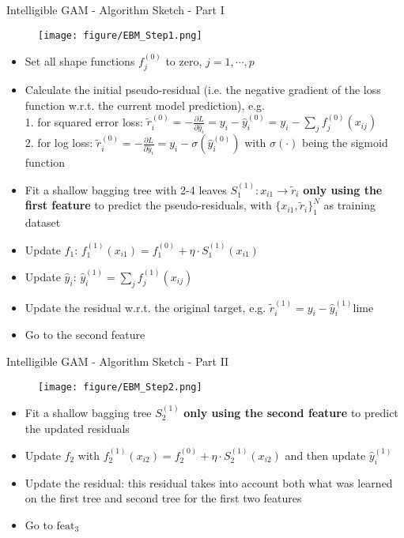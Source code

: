 \documentclass[10pt,compress,t,notes=noshow, xcolor=table]{beamer}
\begin{document}
\begin{frame}{Intelligible GAM - Algorithm Sketch - Part I}

\begin{figure}
    \centering
    \texttt{[image: figure/EBM\_Step1.png]}
    \label{fig:Intelligible EBM_Step1}
\end{figure}
\begin{itemize}
    \item Set all shape functions $f_j^{(0)}$ to zero, $j=1,\cdots,p$
    \item Calculate the initial pseudo-residual (i.e. the negative gradient of the loss function w.r.t. the current model prediction), e.g.\\
    1. for squared error loss: $\tilde{r}_i^{(0)}=-\frac{\partial L}{\partial \hat{y}_i}=y_i-\hat{y}_i^{(0)}=y_i-\sum_jf_j^{(0)}(x_{ij})$\\
    2. for log loss: $\tilde{r}_i^{(0)}=-\frac{\partial L}{\partial \hat{y}_i}=y_i-\sigma(\hat{y}_i^{(0)})$ with $\sigma(\cdot)$ being the sigmoid function
    \item Fit a shallow bagging tree with 2-4 leaves $S_1^{(1)}: x_{i1}\to \tilde{r}_i$ \textbf{only using the first feature} to predict the pseudo-residuals, with $\{x_{i1},\tilde{r}_i\}_1^N$ as training dataset
    \item Update $f_1$: $f_1^{(1)}(x_{i1})=f_1^{(0)}+\eta\cdot S_1^{(1)}(x_{i1})$
    \item Update $\hat{y}_i$: $\hat{y}_i^{(1)}=\sum_jf_j^{(1)}(x_{ij})$
    \item Update the residual w.r.t. the original target, e.g. $\tilde{r}_i^{(1)}=y_i-\hat{y}_i^{(1)}$lime
    \item Go to the second feature
\end{itemize}
\end{frame}

\begin{frame}{Intelligible GAM - Algorithm Sketch - Part II}
\begin{figure}
    \centering
    \texttt{[image: figure/EBM\_Step2.png]}
    \label{fig:Intelligible EBM_Step2}
\end{figure}
\begin{itemize}
    \item Fit a shallow bagging tree $S_2^{(1)}$ \textbf{only using the second feature} to predict the updated residuals
    \item Update $f_2$ with $f_2^{(1)}(x_{i2})=f_2^{(0)}+\eta\cdot S_2^{(1)}(x_{i2})$ and then update $\hat{y}_i^{(1)}$
    \item Update the residual: this residual takes into account both what was learned on the first tree and second tree for the first two features
    \item Go to $\text{feat}_3$
\end{itemize}

\end{frame}
\end{document}
